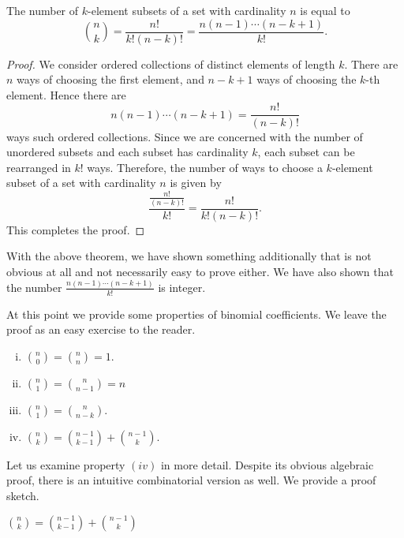 \begin{theorem}
The number of $k$-element subsets of a set with cardinality $n$ is equal to 
$$
{n \choose k}=\frac{n!}{k!(n-k)!}=\frac{n(n-1)\cdots (n-k+1)}{k!}.
$$
\label{thmBinomial}
\end{theorem}

\begin{proof}
We consider ordered collections of distinct elements of length $k$. There are $n$ ways of choosing the first element, and $n-k+1$ ways of choosing the $k$-th element.
Hence there are 
$$
n(n-1)\cdots (n-k+1)=\frac{n!}{(n-k)!}
$$
ways such ordered collections. Since we are concerned with the number of unordered subsets and each subset has cardinality $k$, each subset can be rearranged in $k!$ ways.
Therefore, the number of ways to choose a $k$-element subset of a set with cardinality $n$ is given by 
$$
\frac{\frac{n!}{(n-k)!}}{k!}=\frac{n!}{k!(n-k)!}.
$$
This completes the proof.
\end{proof}

With the above theorem, we have shown something additionally that is not obvious at all and not necessarily easy to prove either.
We have also shown that the number $\frac{n(n-1)\cdots (n-k+1)}{k!}$ is integer.

At this point we provide some properties of binomial coefficients. We leave the proof as an easy exercise to the reader.

\begin{enumerate}[(i)]
    \item $\displaystyle {n \choose 0}={n \choose n}=1$.
    \item $\displaystyle {n \choose 1}={n \choose n-1}=n$
    \item $\displaystyle {n \choose 1}={n \choose n-k}$.
    \item $\displaystyle {n \choose k}={n - 1 \choose k -1} + {n - 1 \choose k}$.
\end{enumerate}

Let us examine property $(iv)$ in more detail. Despite its obvious algebraic proof, there is an intuitive combinatorial version as well.
We provide a proof sketch.

\begin{theorem}
$\displaystyle {n \choose k}={n - 1 \choose k -1} + {n - 1 \choose k}$
\label{recurrencePascal}
\end{theorem}

